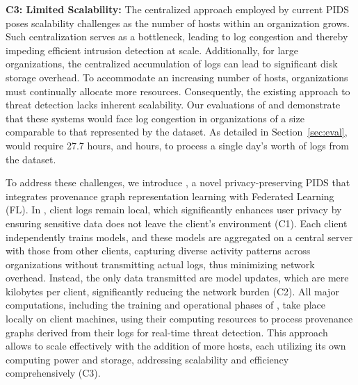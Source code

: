\smallskip
\noindent
\textbf{C3: Limited Scalability:} The centralized approach employed by current PIDS poses scalability challenges as the number of hosts within an organization grows. Such centralization serves as a bottleneck, leading to log congestion and thereby impeding efficient intrusion detection at scale. Additionally, for large organizations, the centralized accumulation of logs can lead to significant disk storage overhead. To accommodate an increasing number of hosts, organizations must continually allocate more resources. Consequently, the existing approach to threat detection lacks inherent scalability. Our evaluations of \flash and \kairos demonstrate that these systems would face log congestion in organizations of a size comparable to that represented by the \optc dataset. As detailed in Section~\ref{sec:eval}, \flash would require 27.7 hours, and  hours, to process a single day's worth of logs from the \optc dataset.

    



To address these challenges, we introduce \Sys, a novel privacy-preserving PIDS that integrates provenance graph representation learning with Federated Learning (FL). In \Sys, client logs remain local, which significantly enhances user privacy by ensuring sensitive data does not leave the client's environment (C1). Each client independently trains \gnnshort models, and these models are aggregated on a central server with those from other clients, capturing diverse activity patterns across organizations without transmitting actual logs, thus minimizing network overhead. Instead, the only data transmitted are model updates, which are mere kilobytes per client, significantly reducing the network burden (C2). All major computations, including the training and operational phases of \Sys, take place locally on client machines, using their computing resources to process provenance graphs derived from their logs for real-time threat detection. This approach allows \Sys to scale effectively with the addition of more hosts, each utilizing its own computing power and storage, addressing scalability and efficiency comprehensively (C3).


